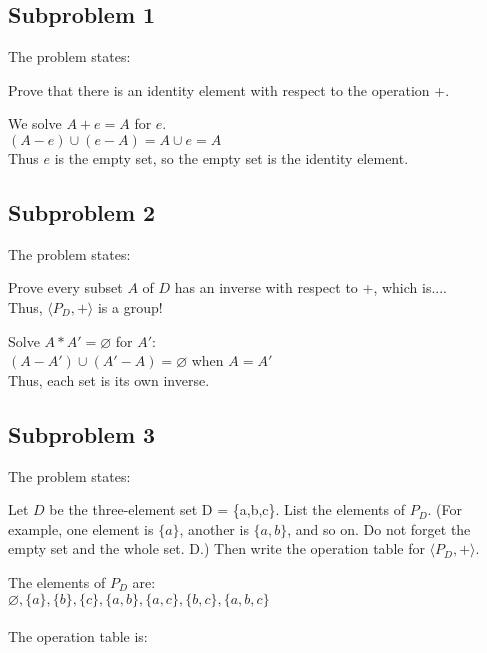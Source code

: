 \documentclass[12pt]{article}
\begin{document}
\subsection{Subproblem 1}
The problem states:
\begin{center}
Prove that there is an identity element with respect to the operation +.
\end{center}
We solve $A+e=A$ for $e$.\\
$(A-e)\cup(e-A)=A\cup e=A$\\
Thus $e$ is the empty set, so the empty set is the identity element.

\subsection{Subproblem 2}
The problem states:
\begin{center}
Prove every subset $A$ of $D$ has an inverse with respect to +, which is.... \\Thus, $\langle P_D,+ \rangle$ is a group!
\end{center}
Solve $A*A'=\varnothing$ for $A'$:\\
$(A-A')\cup(A'-A)=\varnothing$ when $A=A'$\\
Thus, each set is its own inverse.

\subsection{Subproblem 3}
The problem states:
\begin{center}
Let $D$ be the three-element set D = \{a,b,c\}. List the elements of $P_D$. (For example, one element is $\{a\}$, another is $\{a,b\}$, and so on. Do not forget the empty set and the whole set. D.) Then write the operation table for $\langle P_D,+ \rangle$.
\end{center}
The elements of $P_D$ are:\\
$\varnothing,\{a\},\{b\},\{c\},\{a,b\},\{a,c\},\{b,c\},\{a,b,c\}$\\\\
The operation table is:\\
\end{document}
